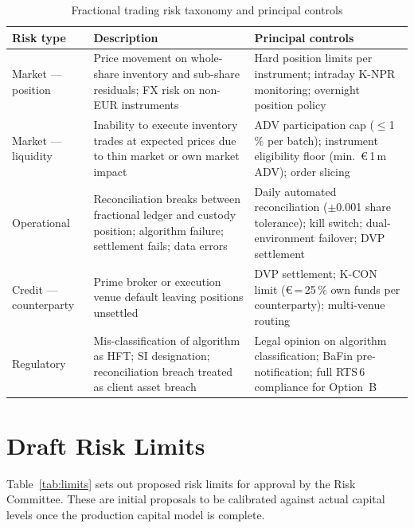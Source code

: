 \documentclass[12pt,a4paper]{report}
\newcommand{\eur}{\euro\,}
\begin{document}
\begin{table}[H]
\caption{Fractional trading risk taxonomy and principal controls}
\label{tab:risktax}
\small
\begin{tabularx}{\textwidth}{@{}L{2.5cm}L{5cm}L{5.5cm}@{}}
\toprule
\textbf{Risk type} & \textbf{Description} & \textbf{Principal controls} \\
\midrule
Market --- position & Price movement on whole-share inventory and sub-share residuals;
  FX risk on non-EUR instruments &
  Hard position limits per instrument; intraday K-NPR monitoring;
  overnight position policy \\[4pt]
Market --- liquidity & Inability to execute inventory trades at expected prices due to
  thin market or own market impact &
  ADV participation cap ($\leq$1\,\% per batch); instrument eligibility floor
  (min.\ \eur{}1\,m ADV); order slicing \\[4pt]
Operational & Reconciliation breaks between fractional ledger and custody position;
  algorithm failure; settlement fails; data errors &
  Daily automated reconciliation ($\pm$0.001 share tolerance);
  kill switch; dual-environment failover; DVP settlement \\[4pt]
Credit --- counterparty & Prime broker or execution venue default leaving positions
  unsettled &
  DVP settlement; K-CON limit (\eur{}{=}\,25\,\% own funds per counterparty);
  multi-venue routing \\[4pt]
Regulatory & Mis-classification of algorithm as HFT; SI designation;
  reconciliation breach treated as client asset breach &
  Legal opinion on algorithm classification; BaFin pre-notification;
  full RTS\,6 compliance for Option~B \\
\bottomrule
\end{tabularx}
\end{table}

\section{Draft Risk Limits}

Table~\ref{tab:limits} sets out proposed risk limits for approval by the Risk Committee.
These are initial proposals to be calibrated against actual capital levels once the
production capital model is complete.
\end{document}
